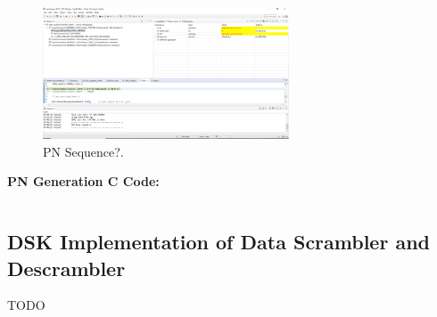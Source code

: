 \documentclass{article}
\begin{document}
\begin{figure}[h]
  \begin{center}
    \includegraphics[width=0.65\textwidth]{img/profile_PN_generation.png}
    \caption{PN Sequence?.}
  \end{center}
\end{figure}


\textbf{PN Generation C Code:}

\begin{verbatim}
\end{verbatim}

\subsection{DSK Implementation of Data Scrambler and Descrambler}
TODO
\end{document}
